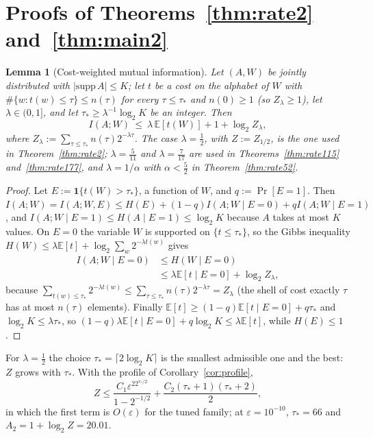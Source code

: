 \documentclass[aps,prx,twocolumn,superscriptaddress,nofootinbib,longbibliography]{revtex4-2}
\theoremstyle{plain}
\newtheorem{lemma}{Lemma}
\theoremstyle{definition}
\theoremstyle{remark}
\newcommand{\E}{\mathbb{E}}
\begin{document}
\section{Proofs of Theorems~\ref{thm:rate2} and~\ref{thm:main2}}\label{app:rate}

\begin{lemma}[Cost-weighted mutual information]\label{lem:gibbs}
Let $(A,W)$ be jointly distributed with $|\mathrm{supp}\,A|\le K$; let $t$ be a cost on the alphabet of $W$ with $\#\{w:t(w)\le\tau\}\le n(\tau)$ for every $\tau\le\tau_*$ and $n(0)\ge1$ (so $Z_\lambda\ge1$), let $\lambda\in(0,1]$, and let $\tau_*\ge\lambda^{-1}\log_2K$ be an integer. Then
\begin{equation}
I(A;W)\ \le\ \lambda\,\E[t(W)]+1+\log_2Z_\lambda,
\end{equation}
where $Z_\lambda:=\sum_{\tau\le\tau_*}n(\tau)2^{-\lambda\tau}$. The case $\lambda=\tfrac12$, with $Z:=Z_{1/2}$, is the one used in Theorem~\ref{thm:rate2}; $\lambda=\tfrac5{11}$ and $\lambda=\tfrac7{17}$ are used in Theorems~\ref{thm:rate115} and~\ref{thm:rate177}, and $\lambda=1/\alpha$ with $\alpha<\tfrac52$ in Theorem~\ref{thm:rate52}.
\end{lemma}
\begin{proof}
Let $E:=\mathbf1\{t(W)>\tau_*\}$, a function of $W$, and $q:=\Pr[E=1]$. Then $I(A;W)=I(A;W,E)\le H(E)+(1-q)I(A;W\mid E=0)+qI(A;W\mid E=1)$, and $I(A;W\mid E=1)\le H(A\mid E=1)\le\log_2K$ because $A$ takes at most $K$ values. On $E=0$ the variable $W$ is supported on $\{t\le\tau_*\}$, so the Gibbs inequality $H(W)\le\lambda\E[t]+\log_2\sum_w2^{-\lambda t(w)}$ gives
\[\begin{aligned}I(A;W\mid E=0)&\le H(W\mid E=0)\\&\le\lambda\E[t\mid E=0]+\log_2Z_\lambda,\end{aligned}\]
because $\sum_{t(w)\le\tau_*}2^{-\lambda t(w)}\le\sum_{\tau\le\tau_*}n(\tau)2^{-\lambda\tau}=Z_\lambda$ (the shell of cost exactly $\tau$ has at most $n(\tau)$ elements). Finally $\E[t]\ge(1-q)\E[t\mid E=0]+q\tau_*$ and $\log_2K\le\lambda\tau_*$, so $(1-q)\lambda\E[t\mid E=0]+q\log_2K\le\lambda\E[t]$, while $H(E)\le1$.
\end{proof}
For $\lambda=\tfrac12$ the choice $\tau_*=\lceil2\log_2K\rceil$ is the smallest admissible one and the best: $Z$ grows with $\tau_*$. With the profile of Corollary~\ref{cor:profile},
\begin{equation}
Z\le\frac{C_1\varepsilon^22^{\tau_*/2}}{1-2^{-1/2}}+\frac{C_2(\tau_*+1)(\tau_*+2)}2,
\end{equation}
in which the first term is $O(\varepsilon)$ for the tuned family; at $\varepsilon=10^{-10}$, $\tau_*=66$ and $A_2=1+\log_2Z=20.01$.
\end{document}
